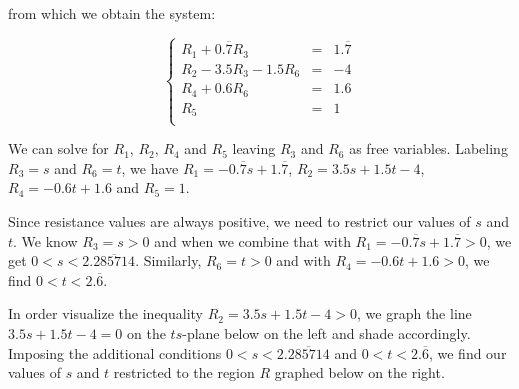 \documentclass{ximera}
\begin{document}
\begin{example}
\begin{explanation}
from which we obtain the system:

\[ \left\{ \begin{array}{rcr} R_1 + 0.\overline{7}R_3& = & 1.\overline{7} \\
R_2 - 3.5R_3 - 1.5R_6& = & -4 \\
R_4 + 0.6R_6 & = & 1.6 \\
R_5& = & 1 \\  \end{array} \right.\]

We can solve for $R_1$, $R_2$, $R_4$ and $R_5$ leaving $R_3$ and $R_6$ as free variables.  Labeling $R_3 = s$ and $R_6 = t$, we have $R_1 = - 0.\overline{7}s + 1.\overline{7}$, $R_2 = 3.5s + 1.5t - 4$, $R_4 = -0.6t + 1.6$ and $R_5 = 1$.  

Since resistance values are always positive, we need to restrict our values of $s$ and $t$.  We know $R_3 = s > 0$ and when we combine that with $R_1 = - 0.\overline{7}s + 1.\overline{7} >0$, we get $0 < s < 2.\overline{285714}$.  Similarly, $R_6 = t > 0$ and with $R_4 = -0.6t + 1.6 > 0$, we find $0 < t <2.\overline{6}$. 

 In order visualize the inequality $R_2 = 3.5s + 1.5t - 4 > 0$, we graph the line $3.5s + 1.5t - 4 =0$ on the $ts$-plane below on the left and shade accordingly.    Imposing the additional conditions $0 < s < 2.\overline{285714}$ and $0 < t <2.\overline{6}$, we find our values of $s$ and $t$ restricted to the region $R$ graphed below on the right.  
 
 

\begin{image}
\end{image}
\end{explanation}
\end{example}
\end{document}
